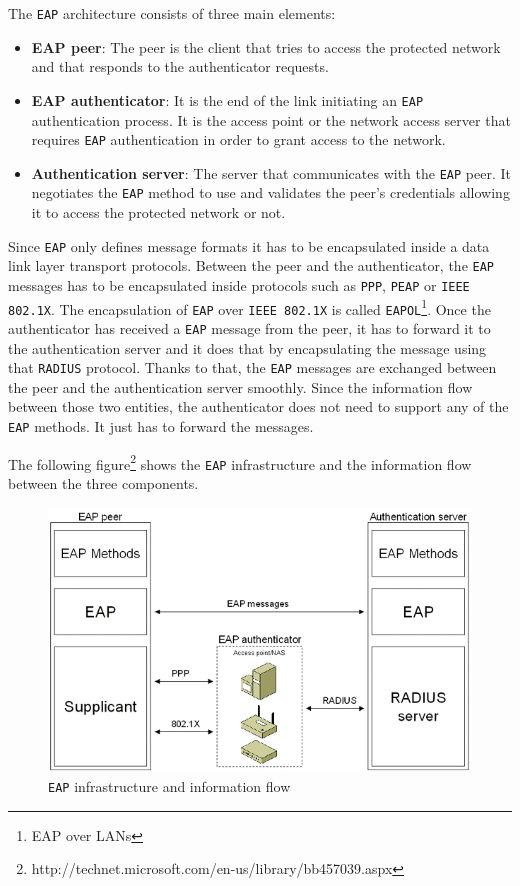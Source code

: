The \texttt{EAP} architecture consists of three main elements:
\begin{itemize}
	\item \textbf{EAP peer}: The peer is the client that tries to access the protected network and that responds to the authenticator requests.
	\item \textbf{EAP authenticator}: It is the end of the link initiating an \texttt{EAP} authentication process. It is the access point or the network access server that requires \texttt{EAP} authentication in order to grant access to the network.
	\item \textbf{Authentication server}: The server that communicates with the \texttt{EAP} peer. It negotiates the \texttt{EAP} method to use and validates the peer's credentials allowing it to access the protected network or not.
\end{itemize}

Since \texttt{EAP} only defines message formats it has to be encapsulated inside a data link layer transport protocols. Between the peer and the authenticator, the \texttt{EAP} messages has to be encapsulated inside protocols such as \texttt{PPP}, \texttt{PEAP} or \texttt{IEEE 802.1X}. The encapsulation of \texttt{EAP} over \texttt{IEEE 802.1X} is called \texttt{EAPOL}\footnote{EAP over LANs}. Once the authenticator has received a \texttt{EAP} message from the peer, it has to forward it to the authentication server and it does that by encapsulating the message using that \texttt{RADIUS} protocol. Thanks to that, the \texttt{EAP} messages are exchanged between the peer and the authentication server smoothly. Since the information flow between those two entities, the authenticator does not need to support any of the \texttt{EAP} methods. It just has to forward the messages.

The following figure\footnote{http://technet.microsoft.com/en-us/library/bb457039.aspx} shows the \texttt{EAP} infrastructure and the information flow between the three components.

\begin{figure}[H]
	\center
	\includegraphics[width=0.7\linewidth]{Pictures/chapter2/eap.png}
	\caption{\texttt{EAP} infrastructure and information flow}
\end{figure}

